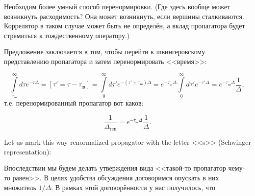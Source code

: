 \documentclass[11pt]{article}
\theoremstyle{remark}
\theoremstyle{definition}
\begin{document}
Необходим более умный способ перенормировки. (Где здесь вообще может возникнуть расходимость? Она может возникнуть, если вершины сталкиваются. Коррелятор в таком случае может быть не определён, а вклад пропагатора будет стремиться к тождественному оператору.)

Предложение заключается в том, чтобы перейти к швингеровскому представлению пропагатора и затем перенормировать <<время>>:

$$\int\limits_{\tau_{\text{ш}}}^{\infty} d\tau e^{-\tau \Delta} = [\tau' = \tau - \tau_{\text{ш}}] = \int\limits_0^{\infty} d\tau' e^{-(\tau' + \tau_{\text{ш}}) \Delta} = e^{-\tau_{\text{ш}} \Delta} \int\limits_0^{\infty} d\tau' e^{-\tau' \Delta} = e^{-\tau_{\text{ш}} \Delta} \frac{1}{\Delta},$$ т.е. перенормированный пропагатор вот каков:

$$\frac{1}{\Delta_{\text{ren}}} = e^{-\tau_{\text{ш}} \Delta} \frac{1}{\Delta}.$$

Let us mark this way renormalized propagator with the letter <<s>> (Schwinger representation):


\begin{center}
\end{center}

Впоследствии мы будем делать утверждения вида <<такой-то пропагатор чему-то равен>>. В целях удобства обсуждения договоримся опускать в них множитель $1/\Delta$. В рамках этой договорённости у нас получилось, что

\begin{center}
\end{center}
\end{document}
